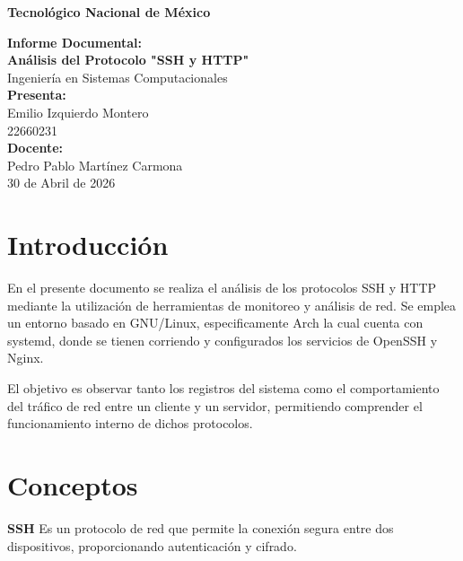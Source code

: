 \documentclass[12pt]{article}
\begin{document}
\begin{titlepage}
\centering

{\large \textbf{Tecnológico Nacional de México}}\\

\vfill

{\Large \textbf{Informe Documental:}}\\[0.5cm]
{\Large \textbf{Análisis del Protocolo "SSH y HTTP"}}\\[1cm]

{\large Ingeniería en Sistemas Computacionales}\\[1cm]

\textbf{Presenta:}\\
Emilio Izquierdo Montero \\
22660231 \\[1cm]

\textbf{Docente:}\\
Pedro Pablo Martínez Carmona \\[1cm]

30 de Abril de 2026

\vfill
\end{titlepage}

\tableofcontents
\newpage

\section{Introducción}

En el presente documento se realiza el análisis de los protocolos SSH y HTTP mediante la utilización de herramientas de monitoreo y análisis de red. Se emplea un entorno basado en GNU/Linux, especificamente Arch la cual cuenta con systemd, donde se tienen corriendo y configurados los servicios de OpenSSH y Nginx.

El objetivo es observar tanto los registros del sistema como el comportamiento del tráfico de red entre un cliente y un servidor, permitiendo comprender el funcionamiento interno de dichos protocolos.

\newpage

%
\section{Conceptos}

\textbf{SSH}  
Es un protocolo de red que permite la conexión segura entre dos dispositivos, proporcionando autenticación y cifrado.
\end{document}
